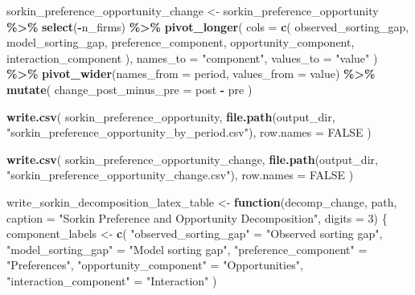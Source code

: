 \documentclass[
]{article}
\newenvironment{Shaded}{\begin{snugshade}}{\end{snugshade}}
\newcommand{\AttributeTok}[1]{\textcolor[rgb]{0.13,0.29,0.53}{#1}}
\newcommand{\ConstantTok}[1]{\textcolor[rgb]{0.56,0.35,0.01}{#1}}
\newcommand{\ControlFlowTok}[1]{\textcolor[rgb]{0.13,0.29,0.53}{\textbf{#1}}}
\newcommand{\DecValTok}[1]{\textcolor[rgb]{0.00,0.00,0.81}{#1}}
\newcommand{\FunctionTok}[1]{\textcolor[rgb]{0.13,0.29,0.53}{\textbf{#1}}}
\newcommand{\NormalTok}[1]{#1}
\newcommand{\OtherTok}[1]{\textcolor[rgb]{0.56,0.35,0.01}{#1}}
\newcommand{\SpecialCharTok}[1]{\textcolor[rgb]{0.81,0.36,0.00}{\textbf{#1}}}
\newcommand{\StringTok}[1]{\textcolor[rgb]{0.31,0.60,0.02}{#1}}
\begin{document}
\begin{Shaded}
\begin{Highlighting}[]
\NormalTok{sorkin\_preference\_opportunity\_change }\OtherTok{\textless{}{-}}\NormalTok{ sorkin\_preference\_opportunity }\SpecialCharTok{\%\textgreater{}\%}
    \FunctionTok{select}\NormalTok{(}\SpecialCharTok{{-}}\NormalTok{n\_firms) }\SpecialCharTok{\%\textgreater{}\%}
    \FunctionTok{pivot\_longer}\NormalTok{(}
        \AttributeTok{cols =} \FunctionTok{c}\NormalTok{(}
\NormalTok{            observed\_sorting\_gap,}
\NormalTok{            model\_sorting\_gap,}
\NormalTok{            preference\_component,}
\NormalTok{            opportunity\_component,}
\NormalTok{            interaction\_component}
\NormalTok{        ),}
        \AttributeTok{names\_to =} \StringTok{"component"}\NormalTok{,}
        \AttributeTok{values\_to =} \StringTok{"value"}
\NormalTok{    ) }\SpecialCharTok{\%\textgreater{}\%}
    \FunctionTok{pivot\_wider}\NormalTok{(}\AttributeTok{names\_from =}\NormalTok{ period, }\AttributeTok{values\_from =}\NormalTok{ value) }\SpecialCharTok{\%\textgreater{}\%}
    \FunctionTok{mutate}\NormalTok{(}
        \AttributeTok{change\_post\_minus\_pre =}\NormalTok{ post }\SpecialCharTok{{-}}\NormalTok{ pre}
\NormalTok{    )}

\FunctionTok{write.csv}\NormalTok{(}
\NormalTok{    sorkin\_preference\_opportunity,}
    \FunctionTok{file.path}\NormalTok{(output\_dir, }\StringTok{"sorkin\_preference\_opportunity\_by\_period.csv"}\NormalTok{),}
    \AttributeTok{row.names =} \ConstantTok{FALSE}
\NormalTok{)}

\FunctionTok{write.csv}\NormalTok{(}
\NormalTok{    sorkin\_preference\_opportunity\_change,}
    \FunctionTok{file.path}\NormalTok{(output\_dir, }\StringTok{"sorkin\_preference\_opportunity\_change.csv"}\NormalTok{),}
    \AttributeTok{row.names =} \ConstantTok{FALSE}
\NormalTok{)}

\NormalTok{write\_sorkin\_decomposition\_latex\_table }\OtherTok{\textless{}{-}} \ControlFlowTok{function}\NormalTok{(decomp\_change, path,}
                                                   \AttributeTok{caption =} \StringTok{"Sorkin Preference and Opportunity Decomposition"}\NormalTok{,}
                                                   \AttributeTok{digits =} \DecValTok{3}\NormalTok{) \{}
\NormalTok{    component\_labels }\OtherTok{\textless{}{-}} \FunctionTok{c}\NormalTok{(}
        \StringTok{"observed\_sorting\_gap"} \OtherTok{=} \StringTok{"Observed sorting gap"}\NormalTok{,}
        \StringTok{"model\_sorting\_gap"} \OtherTok{=} \StringTok{"Model sorting gap"}\NormalTok{,}
        \StringTok{"preference\_component"} \OtherTok{=} \StringTok{"Preferences"}\NormalTok{,}
        \StringTok{"opportunity\_component"} \OtherTok{=} \StringTok{"Opportunities"}\NormalTok{,}
        \StringTok{"interaction\_component"} \OtherTok{=} \StringTok{"Interaction"}
\NormalTok{    )}


\end{Highlighting}
\end{Shaded}
\end{document}

